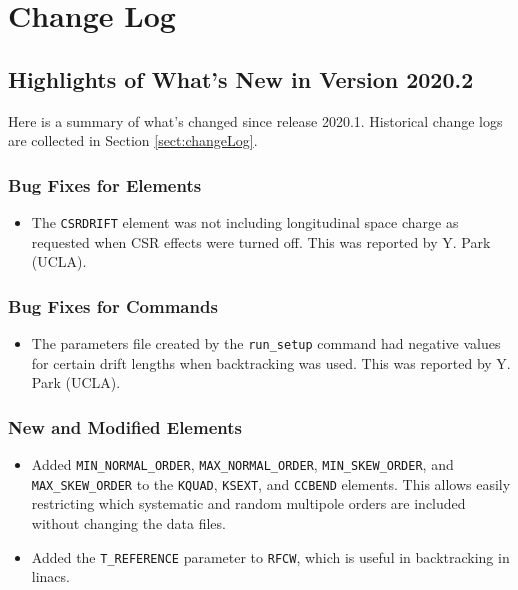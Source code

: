 \documentclass[11pt]{article}
\begin{document}
\newpage

\section{Change Log\label{sect:changeLog}}

\subsection{Highlights of What's New in Version 2020.2}

Here is a summary of what's changed since release 2020.1.  Historical change logs are collected in Section
\ref{sect:changeLog}.

\subsubsection{Bug Fixes for Elements}

\begin{itemize}
\item The \verb|CSRDRIFT| element was not including longitudinal space charge as requested when CSR effects were turned
off.  This was reported by Y. Park (UCLA).
\end{itemize}

\subsubsection{Bug Fixes for Commands}
\begin{itemize}
\item The parameters file created by the \verb|run_setup| command had negative values for certain drift lengths when
backtracking was used.  This was reported by Y. Park (UCLA).
\end{itemize}

\subsubsection{New and Modified Elements}
\begin{itemize}
\item Added \verb|MIN_NORMAL_ORDER|, \verb|MAX_NORMAL_ORDER|, \verb|MIN_SKEW_ORDER|, and \verb|MAX_SKEW_ORDER| to the
\verb|KQUAD|, \verb|KSEXT|, and \verb|CCBEND| elements.  This allows easily restricting which systematic and random
multipole orders are included without changing the data files.
\item Added the \verb|T_REFERENCE| parameter to \verb|RFCW|, which is useful in backtracking in linacs.
\end{itemize}
\end{document}

